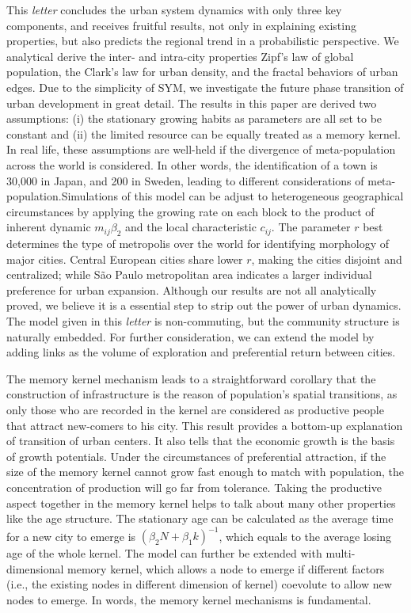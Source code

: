 \documentclass[reprint,unsortedaddress,amsmath,amssymb,aps,prl,fixfloat,showkeys]{revtex4-2}
\begin{document}

This \emph{letter} concludes the urban system dynamics with only three key components, and receives fruitful results, not only in explaining existing properties, but also predicts the regional trend in a probabilistic perspective. We analytical derive the inter- and intra-city properties Zipf's law of global population, the Clark's law for urban density, and the fractal behaviors of urban edges. Due to the simplicity of SYM, we investigate the future phase transition of urban development in great detail. The results in this paper are derived two assumptions: (i) the stationary growing habits as parameters are all set to be constant and (ii) the limited resource can be equally treated as a memory kernel. In real life, these assumptions are well-held if the divergence of meta-population across the world is considered. In other words, the identification of a town is 30,000 in Japan, and 200 in Sweden, leading to different considerations of meta-population.Simulations of this model can be adjust to heterogeneous geographical circumstances by applying the growing rate on each block to the product of inherent dynamic $m_{ij}\beta_2$ and the local characteristic $c_{ij}$. The parameter $r$ best determines the type of metropolis over the world for identifying morphology of major cities. Central European cities share lower $r$, making the cities disjoint and centralized; while São Paulo metropolitan area indicates a larger individual preference for urban expansion. Although our results are not all analytically proved, we believe it is a essential step to strip out the power of urban dynamics. The model given in this \emph{letter} is non-commuting, but the community structure is naturally embedded. For further consideration, we can extend the model by adding links as the volume of exploration and preferential return between cities\cite{WANG2019121921}.

The memory kernel mechanism leads to a straightforward corollary that the construction of infrastructure is the reason of population's spatial transitions, as only those who are recorded in the kernel are considered as productive people that attract new-comers to his city. This result provides a bottom-up explanation of transition of urban centers. It also tells that the economic growth is the basis of growth potentials. Under the circumstances of preferential attraction, if the size of the memory kernel cannot grow fast enough to match with population, the concentration of production will go far from tolerance. Taking the productive aspect together in the memory kernel helps to talk about many other properties like the age structure. The stationary age can be calculated as the average time for a new city to emerge is $(\beta_2 N + \beta_1 k)^{-1}$, which equals to the average losing age of the whole kernel. The model can further be extended with multi-dimensional memory kernel, which allows a node to emerge if different factors (i.e., the existing nodes in different dimension of kernel) coevolute to allow new nodes to emerge. In words, the memory kernel mechanisms is fundamental.


\end{document}
